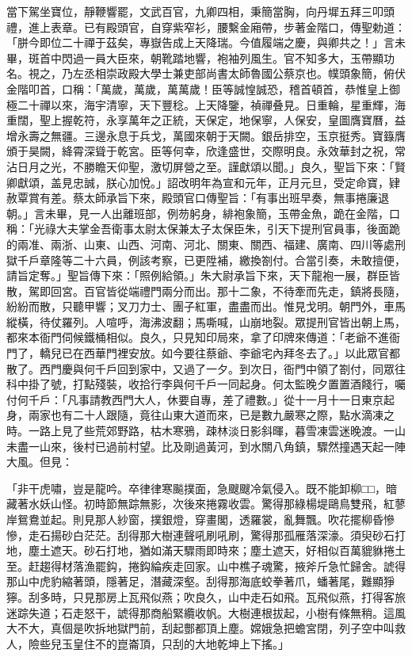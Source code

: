 \begin{showcontents}{}
當下駕坐寶位，靜鞭響罷，文武百官，九卿四相，秉簡當胸，向丹墀五拜三叩頭禮，進上表章。已有殿頭官，自穿紫窄衫，腰繫金廂帶，步著金階口，傳聖勅道：「胼今即位二十禪于茲矣，專嶽告成上天降瑞。今值履端之慶，與卿共之！」言未畢，斑首中閃過一員大臣來，朝靴踏地響，袍袖列風生。官不知多大，玉帶顯功名。視之，乃左丞相崇政殿大學士兼吏部尚書太師魯國公蔡京也。幞頭象簡，俯伏金階叩首，口稱：「萬歲，萬歲，萬萬歲！臣等誠惶誠恐，稽首頓首，恭惟皇上御極二十禪以來，海宇清寧，天下豐稔。上天降鑒，禎禪叠見。日重輪，星重輝，海重闊，聖上握乾符，永享萬年之正統，天保定，地保寧，人保安，皇圖膺寶曆，益增永壽之無疆。三邊永息于兵戈，萬國來朝于天闕。銀岳排空，玉京挺秀。寶籙膺頒于昊闕，絳霄深聳于乾宮。臣等何幸，欣逢盛世，交際明良。永效華封之祝，常沾日月之光，不勝瞻天仰聖，激切屏營之至。謹獻頌以聞。」良久，聖旨下來：「賢卿獻頌，盖見忠誠，朕心加悅。」詔改明年為宣和元年，正月元旦，受定命寶，肄赦覃賞有差。蔡太師承旨下來，殿頭官口傳聖旨：「有事出班早奏，無事捲廉退朝。」言未畢，見一人出離班部，例芴躬身，緋袍象簡，玉帶金魚，跪在金階，口稱：「光祿大夫掌金吾衛事太尉太保兼太子太保臣朱，引天下提刑官員事，後面跪的兩准、兩浙、山東、山西、河南、河北、關東、關西、福建、廣南、四川等處刑獄千戶章隆等二十六員，例該考察，已更陞補，繳換劄付。合當引奏，未敢擅便，請旨定奪。」聖旨傳下來：「照例給領。」朱大尉承旨下來，天下龍袍一展，群臣皆散，駕即回宮。百官皆從端禮門兩分而出。那十二象，不待牽而先走，鎮將長隨，紛紛而散，只聽甲響；叉刀力士、團子紅軍，盡盡而出。惟見戈明。朝門外，車馬縱橫，待仗羅列。人喧呼，海沸波翻；馬嘶喊，山崩地裂。眾提刑官皆出朝上馬，都來本衙門伺候鐵桶相似。良久，只見知印局來，拿了印牌來傳道：「老爺不進衙門了，轎兒已在西華門裡安放。如今要往蔡爺、李爺宅內拜冬去了。」以此眾官都散了。西門慶與何千戶回到家中，又過了一夕。到次日，衙門中領了劄付，同眾往科中掛了號，打點殘裝，收拾行李與何千戶一同起身。何太監晚夕置置酒餞行，囑付何千戶：「凡事請教西門大人，休要自專，差了禮數。」從十一月十一日東京起身，兩家也有二十人跟隨，竟往山東大道而來，已是數九嚴寒之際，點水滴凍之時。一路上見了些荒郊野路，枯木寒鴉，疎林淡日影斜暉，暮雪凍雲迷晚渡。一山未盡一山來，後村已過前村望。比及剛過黃河，到水關八角鎮，驟然撞遇天起一陣大風。但見：

「非干虎嘯，豈是龍吟。卒律律寒飈撲面，急颼颼冷氣侵入。既不能卸柳□□，暗藏著水妖山怪。初時節無踪無影，次後來捲霧收雲。驚得那綠楊堤鷗鳥雙飛，紅蓼岸鴛鴦並起。則見那人紗窗，撲銀燈，穿畫閣，透羅裳，亂舞飄。吹花擺柳昏慘慘，走石揚砂白茫茫。刮得那大樹連聲吼刷吼刷，驚得那孤雁落深濠。須臾砂石打地，塵土遮天。砂石打地，猶如滿天驟雨即時來；塵土遮天，好相似百萬貔貅捲土至。赶趨得材落漁罷鈎，捲鈎綸疾走回家。山中樵子魂驚，掖斧斤急忙歸舍。諕得那山中虎豹縮著頭，隱著足，潛藏深壑。刮得那海底蛟拳著爪，蟠著尾，難顯猙獰。刮多時，只見那房上瓦飛似燕；吹良久，山中走石如飛。瓦飛似燕，打得客旅迷踪失道；石走怒干，諕得那商船緊纜收帆。大樹連根拔起，小樹有條無稍。這風大不大，真個是吹拆地獄門前，刮起酆都頂上塵。嫦娥急把蟾宮閉，列子空中叫救人，險些兒玉皇住不的崑崙頂，只刮的大地乾坤上下搖。」


\end{showcontents}
